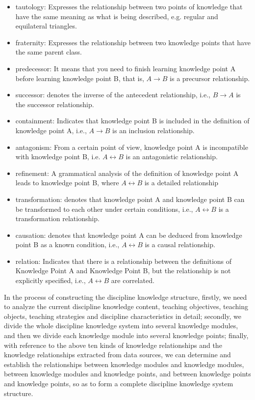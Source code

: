 \documentclass[11pt,en]{elegantpaper}
\begin{document}
\begin{itemize}
	\item tautology: Expresses the relationship between two points of knowledge that have the same meaning as what is being described, e.g. regular and equilateral triangles.
	\item fraternity: Expresses the relationship between two knowledge points that have the same parent class.
	\item predecessor: It means that you need to finish learning knowledge point A before learning knowledge point B, that is, $A\rightarrow B$ is a precursor relationship.
	\item successor: denotes the inverse of the antecedent relationship, i.e., $B\rightarrow A$ is the successor relationship.
	\item containment: Indicates that knowledge point B is included in the definition of knowledge point A, i.e., $A\rightarrow B$ is an inclusion relationship.
	\item antagonism: From a certain point of view, knowledge point A is incompatible with knowledge point B, i.e. $A\leftrightarrow B$ is an antagonistic relationship.
	\item refinement: A grammatical analysis of the definition of knowledge point A leads to knowledge point B, where $A\leftrightarrow B$ is a detailed relationship
	\item transformation: denotes that knowledge point A and knowledge point B can be transformed to each other under certain conditions, i.e., $A\leftrightarrow B$ is a transformation relationship.
	\item causation: denotes that knowledge point A can be deduced from knowledge point B as a known condition, i.e., $A\leftrightarrow B$ is a causal relationship. 
	\item relation: Indicates that there is a relationship between the definitions of Knowledge Point A and Knowledge Point B, but the relationship is not explicitly specified, i.e., $A\leftrightarrow B$ are correlated.
\end{itemize}

In the process of constructing the discipline knowledge structure, firstly, we need to analyze the current discipline knowledge content, teaching objectives, teaching objects, teaching strategies and discipline characteristics in detail; secondly, we divide the whole discipline knowledge system into several knowledge modules, and then we divide each knowledge module into several knowledge points; finally, with reference to the above ten kinds of knowledge relationships and the knowledge relationships extracted from data sources, we can determine and establish the relationships between knowledge modules and knowledge modules, between knowledge modules and knowledge points, and between knowledge points and knowledge points, so as to form a complete discipline knowledge system structure.
\end{document}

